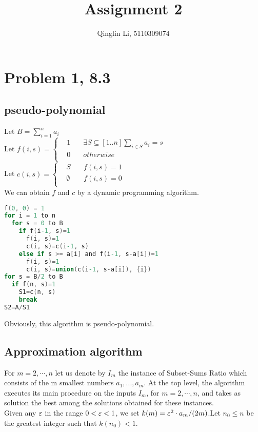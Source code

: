 \documentclass[12pt]{article}
\date{}
\title{Assignment 2}
\author{Qinglin Li, 5110309074}
\begin{document}
\maketitle
\section*{Problem 1, 8.3}
\subsection*{pseudo-polynomial}
Let $B=\sum_{i=1}^n a_i$\\
Let $f(i, s) = \left\{
\begin{aligned}
&1 &\exists S\subseteq [1..n] \sum_{i\in S}a_i=s\\
&0 \quad &otherwise\\
\end{aligned}
\right.$\\
Let $c(i, s) = \left\{
\begin{aligned}
&S \quad &f(i, s) = 1\\
&\emptyset &f(i, s) = 0\\
\end{aligned}
\right.$\\
We can obtain $f$ and $c$ by a dynamic programming algorithm.
\begin{lstlisting}[language=C]
f(0, 0) = 1
for i = 1 to n
  for s = 0 to B
    if f(i-1, s)=1
      f(i, s)=1
      c(i, s)=c(i-1, s)
    else if s >= a[i] and f(i-1, s-a[i])=1
      f(i, s)=1
      c(i, s)=union(c(i-1, s-a[i]), {i})
for s = B/2 to B
  if f(n, s)=1
    S1=c(n, s)
    break
S2=A/S1
\end{lstlisting}
Obviously, this algorithm is  pseudo-polynomial.\\
\subsection*{Approximation algorithm}
For $m = 2, \cdots, n$ let us denote by $I_m$ the instance of Subset-Sums Ratio which consists of the m smallest numbers $a_1, . . . , a_m$. At the top level, the algorithm executes its main procedure on the inputs $I_m$, for $m = 2, \cdots, n$, and takes as solution the best among the solutions obtained for these instances.\\
Given any $\varepsilon$ in the range $0<\varepsilon<1$, we set $k(m)=\varepsilon^2\cdot a_m/(2m)$.Let $n_0\leq n$ be the greatest integer such that $k(n_0) < 1$.\\ 
\end{document}
